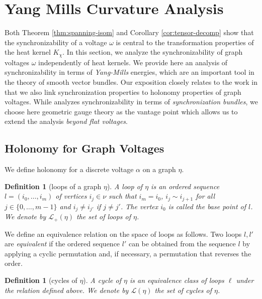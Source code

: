 \documentclass[10pt,reqno]{amsart}
\numberwithin{equation}{section}
\theoremstyle{bfnote}
\theoremstyle{bfdef}
\newtheorem{definition}[theorem]{Definition}
\newcommand{\mc}[1]{\mathcal{#1}}
\providecommand\a; %
\renewcommand{\a}{\alpha}
\providecommand\cc; %
\renewcommand{\cc}{voltage }
\providecommand\Lps; %
\renewcommand{\Lps}{\mc{L}}
\providecommand\vg; %
\renewcommand{\vg}{\chi}
\begin{document}
\section{Yang Mills Curvature Analysis}
\label{sec:ym}

Both Theorem \ref{thm:spanning-isom} and Corollary \ref{cor:tensor-decomp} show that the synchronizability of a voltage $\omega$ is central to the transformation properties of the heat kernel $K_{\vg}$. In this section, we analyze the synchronizability of graph voltages $\omega$ independently of heat kernels.
%
We provide here an analysis of synchronizability in terms of \textit{Yang-Mills} energies, which are an important tool in the theory of smooth vector bundles. Our exposition closely relates to the work \cite{gaoGeometrySynchronizationProblems2019} in that we also link synchronization properties to holonomy properties of graph voltages. While \cite{gaoGeometrySynchronizationProblems2019} analyzes synchronizability in terms of \textit{synchronization bundles}, we choose here geometric gauge theory as the vantage point which allows us to extend the analysis \textit{beyond flat voltages}.

\subsection{Holonomy for Graph Voltages}
    We define holonomy for a discrete \cc $\a$ on a graph $\eta$.

	\begin{definition}[loops of a graph $\eta$]
		A \textit{loop} of $\eta$ is an ordered sequence $l = (i_0,\dots,i_m)$ of vertices $i_{j} \in \nu$ such that $i_{m}=i_{0}$, $i_{j} \sim i_{j+1}$ for all $j \in \{0,\dots,m - 1\}$ and $i_{j} \neq i_{j'}$ if $j \neq j'$. The vertex $i_{0}$ is called the \textit{base point} of $l$. We denote by $\Lps_{+}(\eta)$ the set of loops of $\eta$.
	\end{definition}

	We define an equivalence relation on the space of loops as follows. Two loops $l,l'$ are \textit{equivalent} if the ordered sequence $l'$ can be obtained from the sequence $l$ by applying a cyclic permutation and, if necessary, a permutation that reverses the order.

	\begin{definition}[cycles of $\eta$]
		A \textit{cycle} of $\eta$ is an equivalence class of loops $\ell$ under the relation defined above. We denote by $\Lps(\eta)$ the set of cycles of $\eta$.
	\end{definition}
\end{document}
